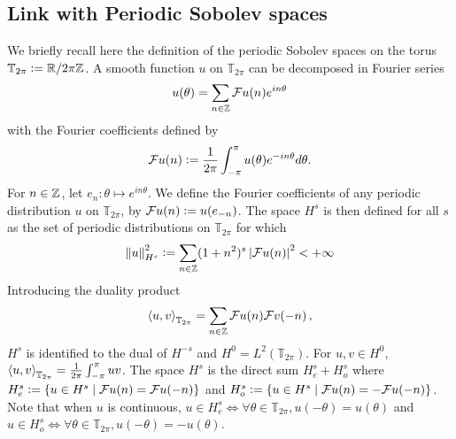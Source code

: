 \documentclass[a4paper]{article}
\begin{document}
\subsection{Link with Periodic Sobolev spaces}
We briefly recall here the definition of the periodic Sobolev spaces on the torus $\mathbb{T}_{2\pi} \mathrel{\mathop:}= \mathbb{R} / 2\pi \mathbb{Z}$. A smooth function $u$ on $\mathbb{T}_{2\pi}$ can be decomposed in Fourier series 
\[u(\theta) = \sum_{n \in \mathbb{Z}} \mathcal{F}u(n) e^{in\theta}\]
with the Fourier coefficients defined by 
\[\mathcal{F}u(n) \mathrel{\mathop:}= \frac{1}{2\pi}\int_{-\pi}^\pi u(\theta) e^{-in\theta}d\theta.\]
For $n\in \mathbb{Z}$, let $e_n : \theta \mapsto e^{in\theta}$. We define the Fourier coefficients of any periodic distribution $u$ on $\mathbb{T}_{2\pi}$, by $\mathcal{F}u(n) \mathrel{\mathop:}= u(e_{-n})$. The space $H^s$ is then defined for all $s$ as the set of periodic distributions on $\mathbb{T}_{2\pi}$ for which 
\[\left\|u\right\|_{H^s}^2 \mathrel{\mathop:}= \sum_{n \in \mathbb{Z}} (1 + n^{2})^s\left\lvert \mathcal{F}u(n) \right\rvert^2 < +\infty \]
Introducing the duality product
\begin{equation}
\label{dualiteSobolevPer}
\left\langle u,v\right\rangle_{\mathbb{T}_{2\pi}} = \sum_{n \in \mathbb{Z}} \mathcal{F}u(n) \mathcal{F}v(-n)\,,
\end{equation}
$H^s$ is identified to the dual of $H^{-s}$ and $H^0 = L^2(\mathbb{T}_{2\pi})$. For $u,v \in  H^0$, $\left\langle u,v\right\rangle_{\mathbb{T}_{2\pi}} = \frac{1}{2\pi} \int_{-\pi}^{\pi} uv$. The space $H^s$ is the direct sum $H^s_e + H^s_o$ where $H^s_e \mathrel{\mathop:}= \left\{u \in H^s\mathrel{}\middle|\mathrel{}\mathcal{F}u(n) = \mathcal{F}u(-n)\right\}$ and $H^s_o \mathrel{\mathop:}= \left\{u \in H^s\mathrel{}\middle|\mathrel{}\mathcal{F}u(n) = -\mathcal{F}u(-n)\right\}$. Note that when $u$ is continuous, $u \in H^s_e \iff \forall \theta \in \mathbb{T}_{2\pi}, u(-\theta) = u(\theta)$ and $u \in H^s_o \iff \forall \theta \in \mathbb{T}_{2\pi}, u(-\theta) = -u(\theta)$. 
\end{document}
